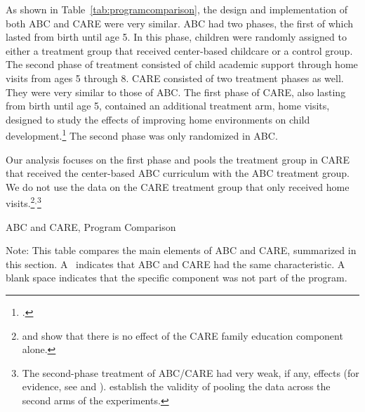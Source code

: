 As shown in Table~\ref{tab:programcomparison}, the design and implementation of both ABC and CARE were very similar. ABC had two phases, the first of which lasted from birth until age 5. In this phase, children were randomly assigned to either a treatment group that received center-based childcare or a control group. The second phase of treatment consisted of child academic support through home visits from ages 5 through 8. CARE consisted of two treatment phases as well. They were very similar to those of ABC. The first phase of CARE, also lasting from birth until age 5, contained an additional treatment arm, home visits, designed to study the effects of improving home environments on child development.\footnote{\citet{Wasik_Ramey_etal_1990_CD}.} The second phase was only randomized in ABC.

Our analysis focuses on the first phase and pools the treatment group in CARE that received the center-based ABC curriculum with the ABC treatment group. We do not use the data on the CARE treatment group that only received home visits.\footnote{\citet{Campbell_Conti_etal_2014_EarlyChildhoodInvestments} and \citet{ABCCARE_Dataset} show that there is no effect of the CARE family education component alone.}$^,$\footnote{The second-phase treatment of ABC/CARE had very weak, if any, effects (for evidence, see \citealp{Campbell_Conti_etal_2014_EarlyChildhoodInvestments} and \citealp{ABCCARE_Dataset}). \citet{Campbell_Conti_etal_2014_EarlyChildhoodInvestments} establish the validity of pooling the data across the second arms of the experiments.}

\begin{table}[!htbp]
\centering
\caption{ABC and CARE, Program Comparison} \label{tab:programcomparison}
\begin{adjustbox}{max width=\textwidth}
\begin{threeparttable}
	\small
	
\begin{tablenotes}
\small
\item Note: This table compares the main elements of ABC and CARE, summarized in this section. A \checkmark\ indicates that ABC and CARE had the same characteristic. A blank space indicates that the specific component was not part of the program.
\end{tablenotes}
\end{threeparttable}
\end{adjustbox}
\end{table}

